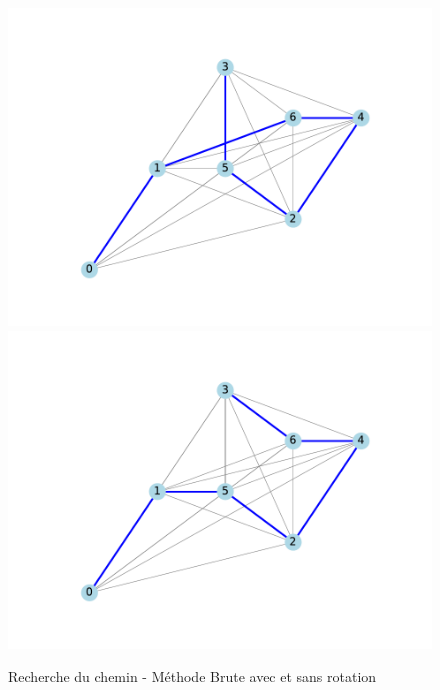 \documentclass{article}
\begin{document}
\begin{figure}
	\centering
	\includegraphics[scale=0.4]{figs/best_path_arbitrary_slow_turning.pdf}
	\includegraphics[scale=0.4]{figs/best_path_arbitrary.pdf}
	\caption{Recherche du chemin - Méthode Brute avec et sans rotation}
	\label{tsp_turn_1}
\end{figure}
\end{document}
